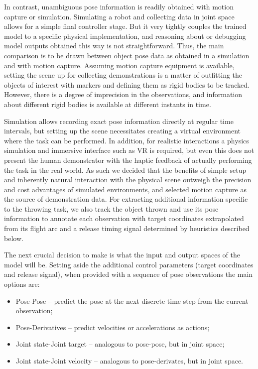 \documentclass{article}
\begin{document}
In contrast, unambiguous pose information is readily obtained with motion capture or simulation. Simulating a robot and collecting data in joint space allows for a simple final controller stage. But it very tightly couples the trained model to a specific physical implementation, and reasoning about or debugging model outputs obtained this way is not straightforward. Thus, the main comparison is to be drawn between object pose data as obtained in a simulation and with motion capture. Assuming motion capture equipment is available, setting the scene up for collecting demonstrations is a matter of outfitting the objects of interest with markers and defining them as rigid bodies to be tracked. However, there is a degree of imprecision in the observations, and information about different rigid bodies is available at different instants in time. 

Simulation allows recording exact pose information directly at regular time intervals, but setting up the scene necessitates creating a virtual environment where the task can be performed. In addition, for realistic interactions a physics simulation and immersive interface such as VR is required, but even this does not present the human demonstrator with the haptic feedback of actually performing the task in the real world. As such we decided that the benefits of simple setup and inherently natural interaction with the physical scene outweigh the precision and cost advantages of simulated environments, and selected motion capture as the source of demonstration data. For extracting additional information specific to the throwing task, we also track the object thrown and use its pose information to annotate each observation with target coordinates extrapolated from its flight arc and a release timing signal determined by heuristics described below.

The next crucial decision to make is what the input and output spaces of the model will be. Setting aside the additional control parameters (target coordinates and release signal), when provided with a sequence of pose observations the main options are:
\begin{itemize}
	\item Pose-Pose -- predict the pose at the next discrete time step from the current observation;
	\item Pose-Derivatives -- predict velocities or accelerations as actions;
	\item Joint state-Joint target -- analogous to pose-pose, but in joint space;
	\item Joint state-Joint velocity -- analogous to pose-derivates, but in joint space.
\end{itemize}
\end{document}
